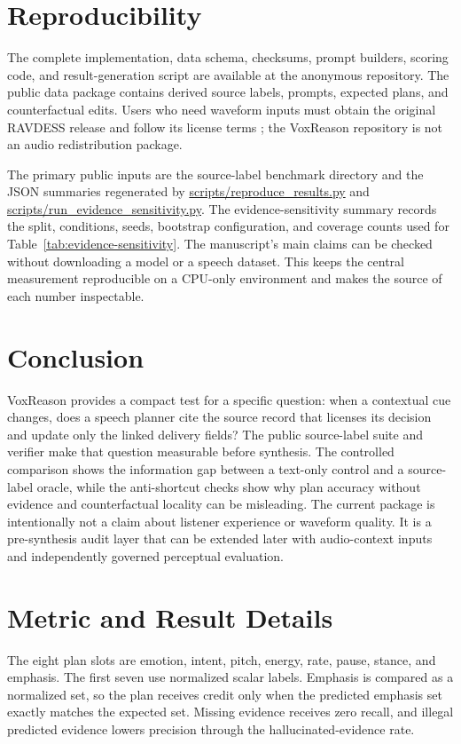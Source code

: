 \documentclass{article}
\newcommand{\repo}{the anonymous repository}
\begin{document}
\section{Reproducibility}

The complete implementation, data schema, checksums, prompt builders, scoring code, and result-generation script are available at \repo. The public data package contains derived source labels, prompts, expected plans, and counterfactual edits. Users who need waveform inputs must obtain the original RAVDESS release and follow its license terms \cite{ravdess}; the VoxReason repository is not an audio redistribution package.

The primary public inputs are the source-label benchmark directory and the JSON summaries regenerated by \url{scripts/reproduce_results.py} and \url{scripts/run_evidence_sensitivity.py}. The evidence-sensitivity summary records the split, conditions, seeds, bootstrap configuration, and coverage counts used for Table~\ref{tab:evidence-sensitivity}. The manuscript's main claims can be checked without downloading a model or a speech dataset. This keeps the central measurement reproducible on a CPU-only environment and makes the source of each number inspectable.

\section{Conclusion}

VoxReason provides a compact test for a specific question: when a contextual cue changes, does a speech planner cite the source record that licenses its decision and update only the linked delivery fields? The public source-label suite and verifier make that question measurable before synthesis. The controlled comparison shows the information gap between a text-only control and a source-label oracle, while the anti-shortcut checks show why plan accuracy without evidence and counterfactual locality can be misleading. The current package is intentionally not a claim about listener experience or waveform quality. It is a pre-synthesis audit layer that can be extended later with audio-context inputs and independently governed perceptual evaluation.

\appendix
\section{Metric and Result Details}

The eight plan slots are emotion, intent, pitch, energy, rate, pause, stance, and emphasis. The first seven use normalized scalar labels. Emphasis is compared as a normalized set, so the plan receives credit only when the predicted emphasis set exactly matches the expected set. Missing evidence receives zero recall, and illegal predicted evidence lowers precision through the hallucinated-evidence rate.
\end{document}

